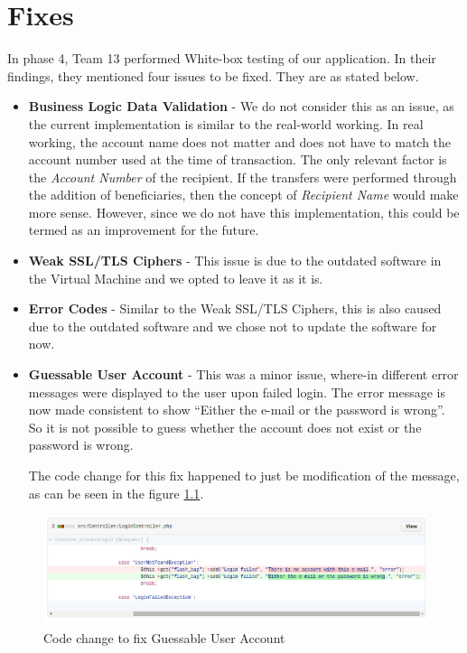 \chapter{Fixes}

In phase 4, Team 13 performed White-box testing of our application. In their findings, they mentioned four issues to be fixed. They are as stated below.

\begin{itemize}
\item \textbf{Business Logic Data Validation} - We do not consider this as an issue, as the current implementation is similar to the real-world working. In real working, the account name does not matter and does not  have to match the account number used at the time of transaction. The only relevant factor is the \textit{Account Number} of the recipient. 
If the transfers were performed through the addition of beneficiaries, then the concept of \textit{Recipient Name} would make more sense. However, since we do not have this implementation, this could be termed as an improvement for the future.

\item \textbf{Weak SSL/TLS Ciphers} - This issue is due to the outdated software in the Virtual Machine and we opted to leave it as it is. 

\item \textbf{Error Codes} - Similar to the Weak SSL/TLS Ciphers, this is also caused due to the outdated software and we chose not to update the software for now.

\item \textbf{Guessable User Account} - This was a minor issue, where-in different error messages were displayed to the user upon failed login. The error message is now made consistent to show \enquote{Either the e-mail or the password is wrong}. So it is not possible to guess whether the account does not exist or the password is wrong.

The code change for this fix happened to just be modification of the message, as can be seen in the figure \ref{fig:fix_guessable_account}.

\end{itemize}

\begin{figure}[ht]
	\centering
	\includegraphics[width=.8\linewidth]{figures/fix_guessable_account.png}
	\caption{Code change to fix Guessable User Account}
	\label{fig:fix_guessable_account}
\end{figure}

\clearpage